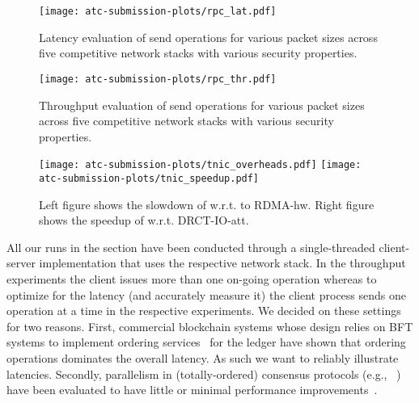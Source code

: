 \begin{figure*}
    \centering
   \texttt{[image: atc-submission-plots/rpc\_lat.pdf]} 
  \caption{Latency evaluation of send operations for various packet sizes across five competitive network stacks with various security properties.}
  \label{fig:net_latencies}
\end{figure*}

\begin{figure}
    \centering
   \texttt{[image: atc-submission-plots/rpc\_thr.pdf]} 
    \caption{Throughput evaluation of send operations for various packet sizes across five competitive network stacks with various security properties.}
  \label{fig:net_throughput}
\end{figure}

\begin{figure}[t!]
\begin{center}
  \centering
  \texttt{[image: atc-submission-plots/tnic\_overheads.pdf]} 
\endminipage
{}
  \centering
  \texttt{[image: atc-submission-plots/tnic\_speedup.pdf]} 
\endminipage
\end{center}
\caption{Left figure shows the slowdown of \projecttitle{} w.r.t. to RDMA-hw. Right figure shows the speedup of \projecttitle{} w.r.t. DRCT-IO-att.}\label{fig:net_slowdown}
\end{figure}
\fi

 All our runs in the section have been conducted through a single-threaded client-server implementation that uses the respective network stack. In the throughput experiments the client issues more than one on-going operation whereas to optimize for the latency (and accurately measure it) the client process sends one operation at a time in the respective experiments.  We decided on these settings for two reasons. First, commercial blockchain systems whose design relies on BFT systems to implement ordering services~\cite{10.1145/3190508.3190538} for the ledger have shown that ordering operations dominates the overall latency. As such we want to reliably illustrate \projecttitle{} latencies. Secondly, parallelism in (totally-ordered) consensus protocols (e.g., ~\cite{10.1145/3190508.3190538}) have been evaluated to have little or minimal performance improvements~\cite{f04eb9b864204bab958e72055062748c, 10.1145/3299869.3319893}.

